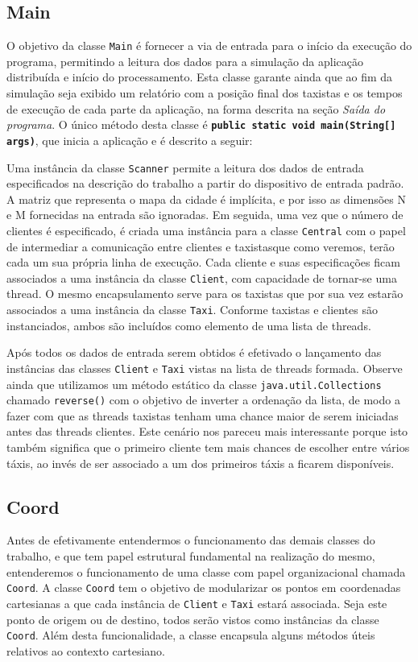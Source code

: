 \documentclass[a4paper,landscape,12pt]{article}
\begin{document}
\subsection{Main}
O objetivo da classe \texttt{Main} é fornecer a via de entrada para o início da execução do programa, permitindo a leitura dos dados para a simulação da aplicação distribuída e início do processamento. Esta classe garante ainda que ao fim da simulação seja exibido um relatório com a posição final dos taxistas e os tempos de execução de cada parte da aplicação, na forma descrita na seção \textit{Saída do programa}. O único método desta classe é \textbf{\texttt{public static void main(String[] args)}}, que inicia a aplicação e é descrito a seguir:

Uma instância da classe \texttt{Scanner} permite a leitura dos dados de entrada especificados na descrição do trabalho a partir do dispositivo de entrada padrão. A matriz que representa o mapa da cidade é implícita, e por isso as dimensões N e M fornecidas na entrada são ignoradas. Em seguida, uma vez que o número de clientes é especificado, é criada uma instância para a classe \texttt{Central} com o papel de intermediar a comunicação entre clientes e taxistas\textemdash que como veremos, terão cada um sua própria linha de execução. Cada cliente e suas especificações ficam associados a uma instância da classe \texttt{Client}, com capacidade de tornar-se uma thread. O mesmo encapsulamento serve para os taxistas que por sua vez estarão associados a uma instância da classe \texttt{Taxi}. Conforme taxistas e clientes são instanciados, ambos são incluídos como elemento de uma lista de threads.

Após todos os dados de entrada serem obtidos é efetivado o lançamento das instâncias das classes \texttt{Client} e \texttt{Taxi} vistas na lista de threads formada. Observe ainda que utilizamos um método estático da classe \texttt{java.util.Collections} chamado \texttt{reverse()} com o objetivo de inverter a ordenação da lista, de modo a fazer com que as threads taxistas tenham uma chance maior de serem iniciadas antes das threads clientes. Este cenário nos pareceu mais interessante porque isto também significa que o primeiro cliente tem mais chances de escolher entre vários táxis, ao invés de ser associado a um dos primeiros táxis a ficarem disponíveis.

\subsection{Coord}
Antes de efetivamente entendermos o funcionamento das demais classes do trabalho, e que tem papel estrutural fundamental na realização do mesmo, entenderemos o funcionamento de uma classe com papel organizacional chamada \texttt{Coord}. A classe \texttt{Coord} tem o objetivo de modularizar os pontos em coordenadas cartesianas a que cada instância de \texttt{Client} e \texttt{Taxi} estará associada. Seja este ponto de origem ou de destino, todos serão vistos como instâncias da classe \texttt{Coord}. 
Além desta funcionalidade, a classe encapsula alguns métodos úteis relativos ao contexto cartesiano.
\end{document}
